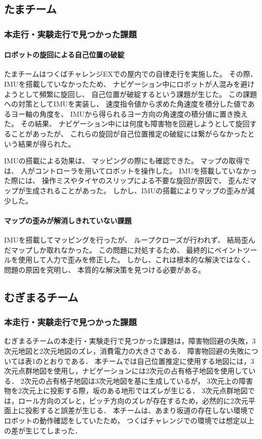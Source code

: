\documentclass[twocolumn,9pt]{jsproceedings}
\begin{document}
\subsection{たまチーム}
\subsubsection{本走行・実験走行で見つかった課題}
\paragraph{ロボットの旋回による自己位置の破綻}


たまチームはつくばチャレンジEXでの屋内での自律走行を実施した。
その際、IMUを搭載していなかったため、
ナビゲーション中にロボットが人混みを避けようとして頻繁に旋回し、
自己位置が破綻するという課題が生じた。
この課題への対策としてIMUを実装し、
速度指令値から求めた角速度を積分した値であるヨー軸の角度を、
IMUから得られるヨー方向の角速度の積分値に置き換えた。
その結果、
ナビゲーション中には何度も障害物を回避しようとして旋回することがあったが、
これらの旋回が自己位置推定の破綻には繋がらなかったという結果が得られた。


IMUの搭載による効果は、
マッピングの際にも確認できた。
マップの取得では、
人がコントローラを用いてロボットを操作した。
IMUを搭載していなかった際には、
操作ミスやタイヤのスリップによる不要な旋回が原因で、
歪んだマップが生成されることがあった。
しかし、IMUの搭載によりマップの歪みが減少した。


\paragraph{マップの歪みが解消しきれていない課題}


IMUを搭載してマッピングを行ったが、
ループクローズが行われず、
結局歪んだマップしか取れなかった。
この問題に対処するため、
最終的にペイントツールを使用して人力で歪みを修正した。
しかし、これは根本的な解決ではなく、
問題の原因を究明し、
本質的な解決策を見つける必要がある。

\subsection{むぎまるチーム}
\subsubsection{本走行・実験走行で見つかった課題}

むぎまるチームの本走行・実験走行で見つかった課題は，障害物回避の失敗，3次元地図と2次元地図のズレ，消費電力の大きさである．
障害物回避の失敗については表1のとおりである．
本チームでは自己位置推定に使用する地図には，3次元点群地図を使用し，ナビゲーションには2次元の占有格子地図を使用している．
2次元の占有格子地図は3次元地図を基に生成しているが，
3次元上の障害物を2次元上に投影する際，坂のある地形ではズレが生じる．
3次元点群地図では，ロール方向のズレと，ピッチ方向のズレが存在するため，必然的に2次元平面上に投影すると誤差が生じる．
本チームは、あまり坂道の存在しない環境でロボットの動作確認をしていたため，
つくばチャレンジでの環境では想定以上の差が生じてしまった．
\end{document}
